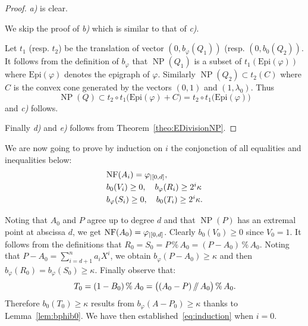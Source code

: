 \documentclass{sig-alternate-2013}
\DeclareMathOperator{\NP}{NP}
\newcommand{\NF}{\text{\rm NF}}
\renewcommand{\mod}{\,\%\,}
\renewcommand{\div}{\,/\hspace{-0.3em}/\,}
\newcommand{\Epi}{\textrm{Epi}}
\begin{document}
\begin{proof}
\emph{a)} is clear.

We skip the proof of \emph{b)} which is similar to that of \emph{c)}.

Let $t_1$ (resp. $t_2$) be the translation of vector $(0, b_\varphi
(Q_1))$ (resp. $(0, b_0(Q_2))$. It follows from the definition of
$b_\varphi$ that $\NP(Q_1)$ is a subset of $t_1(\Epi(\varphi))$ where
$\Epi(\varphi)$ denotes the epigraph of $\varphi$. Similarly $\NP(Q_2)
\subset t_2(C)$ where $C$ is the convex cone generated by the vectors
$(0,1)$ and $(1, \lambda_0)$. Thus
$$\NP(Q) \subset t_2 \circ t_1 \big(\Epi(\varphi) + C\big) =
t_2 \circ t_1\big(\Epi(\varphi)\big)$$
and \emph{c)} follows.

Finally \emph{d)} and \emph{e)} follows from
Theorem~\ref{theo:EDivisionNP}.
\end{proof}

We are now going to prove by induction on $i$ the conjonction of all
equalities and inequalities below:
\begin{equation}
\label{eq:induction}
\begin{array}{l}
\NF(A_i) = \varphi_{|[0,d]}, \smallskip \\
b_0(V_i) \geq 0, \quad
b_\varphi(R_i) \geq 2^i \kappa \smallskip \\
b_\varphi(S_i) \geq 0, \quad
b_0(T_i) \geq 2^i \kappa.
\end{array}
\end{equation}

Noting that $A_0$ and $P$ agree up to degree $d$ and that $\NP(P)$ has 
an extremal point at abscissa $d$, we get $\NF(A_0) = \varphi_{|[0,d]}$.
Clearly $b_0(V_0) \geq 0$ since $V_0 = 1$. It follows from the 
definitions that $R_0 = S_0 = P \mod A_0 = (P{-}A_0) \mod A_0$. 
Noting that $P{-}A_0 = \sum_{i=d+1}^n a_i X^i$, we obtain
$b_\varphi(P{-}A_0) \geq \kappa$ and then $b_\varphi(R_0) = b_\varphi(S_0)
\geq \kappa$. Finally observe that:
$$T_0 = (1 - B_0) \mod A_0 = \big((A_0 - P) \div A_0\big) \mod A_0.$$
Therefore $b_0(T_0) \geq \kappa$ results from $b_\varphi(A{-}P_0) \geq 
\kappa$ thanks to Lemma~\ref{lem:bphib0}. 
We have then established~\eqref{eq:induction} when $i = 0$.
\end{document}
